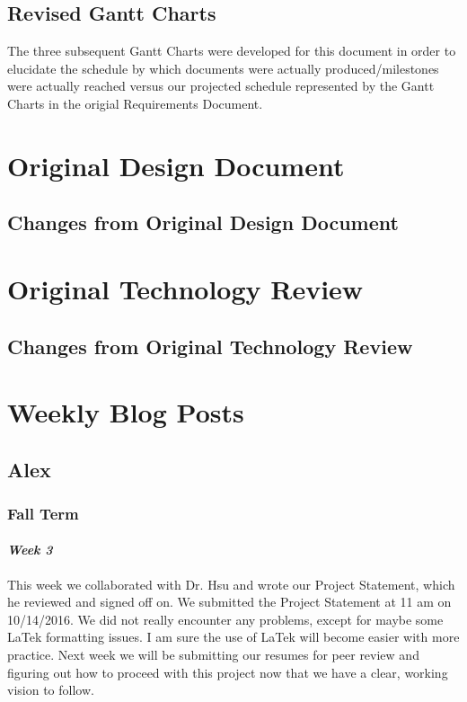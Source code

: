 \documentclass[onecolumn, draftclsnofoot,10pt, compsoc]{IEEEtran}
\begin{document}
\subsection{Revised Gantt Charts}
The three subsequent Gantt Charts were developed for this document in order to elucidate the schedule by which documents were actually produced/milestones were actually reached versus our projected schedule represented by the Gantt Charts in the origial Requirements Document.


\section{Original Design Document}

\subsection{Changes from Original Design Document}

\section{Original Technology Review}


\subsection{Changes from Original Technology Review}

\section{Weekly Blog Posts}
\subsection{Alex}
\subsubsection{Fall Term}
\paragraph{\emph{Week 3}}
This week we collaborated with Dr. Hsu and wrote our Project Statement, which he reviewed and signed off on. We submitted the Project Statement at 11 am on 10/14/2016. We did not really encounter any problems, except for maybe some LaTek formatting issues. I am sure the use of LaTek will become easier with more practice. Next week we will be submitting our resumes for peer review and figuring out how to proceed with this project now that we have a clear, working vision to follow.
\end{document}
